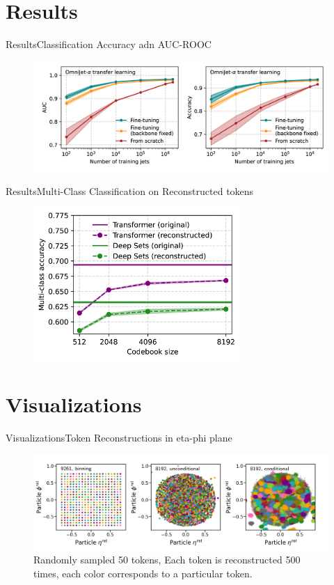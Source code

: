 \documentclass[10pt]{beamer}
\begin{document}
\section{Results}

\begin{frame}{Results}{Classification Accuracy adn AUC-ROOC}
  \begin{figure}
    \includegraphics[width=\textwidth]{accuracy.png}
  \end{figure}
\end{frame}

\begin{frame}{Results}{Multi-Class Classification on Reconstructed tokens}
  \begin{figure}
    \includegraphics[width=0.7\textwidth]{token_quality.png}
  \end{figure}
\end{frame}

\section{Visualizations}

\begin{frame}{Visualizations}{Token Reconstructions in eta-phi plane}
  \begin{figure}
    \includegraphics[width=\textwidth]{images/token_reconstruction.png}
    \caption{Randomly sampled 50 tokens, Each token is reconstructed 500 times, each color corresponds to a particular token.}
  \end{figure}
\end{frame}
\end{document}
